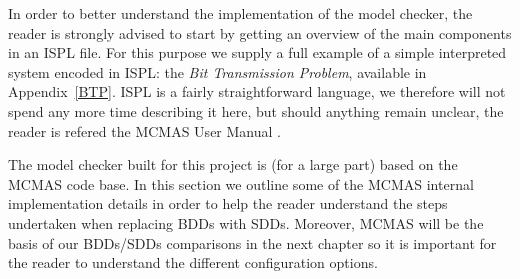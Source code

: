 \documentclass[11pt]{report}
\begin{document}
In order to better understand the implementation of the model checker, the reader is strongly advised to start by getting an overview of the main components in an ISPL file. For this purpose we supply a full example of a simple interpreted system encoded in ISPL: the \textit{Bit Transmission Problem}, available in Appendix~\ref{BTP}. ISPL is a fairly straightforward language, we therefore will not spend any more time describing it here, but should anything remain unclear, the reader is refered the MCMAS User Manual \cite{MCMAS_website}.



The model checker built for this project is (for a large part) based on the MCMAS code base. In this section we outline some of the MCMAS internal implementation details in order to help the reader understand the steps undertaken when replacing BDDs with SDDs. Moreover, MCMAS will be the basis of our BDDs/SDDs comparisons in the next chapter so it is important for the reader to understand the different configuration options.
\end{document}
